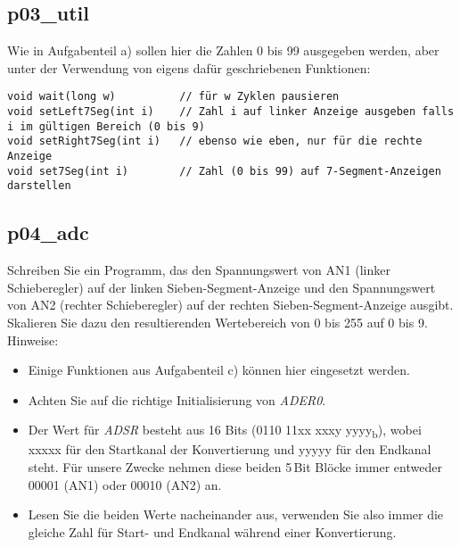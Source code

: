 \documentclass[
  accentcolor=tud1c,	%
  colorbacktitle,		%
  inverttitle,			%
  german,				%
  twoside
]{tudexercise}
\begin{document}
\subsection{p03\_util}
Wie in Aufgabenteil a) sollen hier die Zahlen 0 bis 99 ausgegeben werden, aber unter der Verwendung von eigens dafür geschriebenen Funktionen:
\begin{lstlisting}
void wait(long w)          // für w Zyklen pausieren
void setLeft7Seg(int i)    // Zahl i auf linker Anzeige ausgeben falls i im gültigen Bereich (0 bis 9)
void setRight7Seg(int i)   // ebenso wie eben, nur für die rechte Anzeige
void set7Seg(int i)        // Zahl (0 bis 99) auf 7-Segment-Anzeigen darstellen
\end{lstlisting}

\subsection{p04\_adc}
Schreiben Sie ein Programm, das den Spannungswert von AN1 (linker Schieberegler) auf der linken Sieben-Segment-Anzeige und den Spannungswert von AN2 (rechter Schieberegler) auf der rechten Sieben-Segment-Anzeige ausgibt. Skalieren Sie dazu den resultierenden Wertebereich von 0 bis 255 auf 0 bis 9.\\
Hinweise:
\begin{itemize}
\item Einige Funktionen aus Aufgabenteil c) können hier eingesetzt werden.
\item Achten Sie auf die richtige Initialisierung von \textit{ADER0}.
\item Der Wert für \textit{ADSR} besteht aus 16 Bits (0110 11xx xxxy yyyy\textsubscript{b}), wobei xxxxx für den Startkanal der Konvertierung und yyyyy für den Endkanal steht. Für unsere Zwecke nehmen diese beiden 5\,Bit Blöcke immer entweder 00001 (AN1) oder 00010 (AN2) an.
\item Lesen Sie die beiden Werte nacheinander aus, verwenden Sie also immer die gleiche Zahl für Start- und Endkanal während einer Konvertierung.
\end{itemize}
\end{document}
